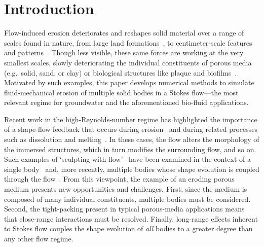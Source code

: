 \documentclass[preprint, 10pt]{elsarticle}
\begin{document}
\maketitle

\section{Introduction\label{s:intro}}
Flow-induced erosion deteriorates and reshapes solid material over a range of scales found in nature, from large land formations~\cite{han1969, jerolmack2012internal, Rothman2012, coh-dev-sey-yi-szy-rot2015}, to centimeter-scale features and patterns~\cite{daerr2003erosion}. Though less visible, these same forces are working at the very smallest scales, slowly deteriorating the individual constituents of porous media (e.g.~solid, sand, or clay) or biological structures like plaque and biofilms~\cite{bear2013dynamics, pic-van-hei2000, sha2002, gro-gij-van-fer-hat-van-yua-wen2007}. Motivated by such examples, this paper develops numerical methods to simulate fluid-mechanical erosion of multiple solid bodies in a Stokes flow---the most relevant regime for groundwater and the aforementioned bio-fluid applications.

Recent work in the high-Reynolds-number regime has highlighted the importance of a shape-flow feedback that occurs during erosion~\cite{ris-moo-chi-she-zha2012, moo-ris-chi-zha-she2013, hewett2017evolution, moore2017riemann} and during related processes such as dissolution and melting~\cite{Huang2015, kondratiuk2015steadily, dallaston2015channelization, rycroft2016asymmetric, cohen2016erosion, hewett2017pear, claudin2017dissolution}.  In these cases, the flow alters the morphology of the immersed structures, which in turn modifies the surrounding flow, and so on. Such examples of `sculpting with flow'~\cite{ristroph2018sculpting} have been examined in the context of a single body~\cite{ris-moo-chi-she-zha2012, moore2017riemann} and, more recently, multiple bodies whose shape evolution is coupled through the flow~\cite{hewett2017evolution}. From this viewpoint, the example of an eroding porous medium presents new opportunities and challenges. First, since the medium is composed of many individual constituents, multiple bodies must be considered. Second, the tight-packing present in typical porous-media applications means that close-range interactions must be resolved. Finally, long-range effects inherent to Stokes flow couples the shape evolution of {\em all} bodies to a greater degree than any other flow regime.
\end{document}
